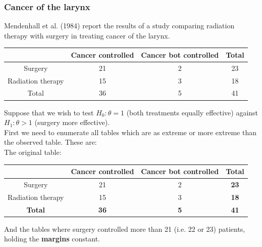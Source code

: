 \documentclass[a4paper]{article}
\begin{document}
\subsubsection{Cancer of the larynx}
Mendenhall et al. (1984) report the results of a study comparing radiation therapy with surgery in treating cancer of the larynx.
\begin{table}[H]
	\centering
	\begin{tabular}{@{}c|cc|c@{}}
	\toprule
				      & \textbf{Cancer controlled} & \textbf{Cancer bot controlled} & \textbf{Total} \\ \midrule
	Surgery           & 21                         & 2                              & 23             \\
	Radiation therapy & 15                         & 3                              & 18             \\ \midrule
	Total             & 36                         & 5                              & 41             \\ \bottomrule
	\end{tabular}
\end{table}
Suppose that we wish to test \( H_0: \theta =1 \) (both treatments equally effective) against \( H_1: \theta >1 \) (surgery more effective).\\
First we need to enumerate all tables which are \textcolor{mygreen}{as extreme} or \textcolor{myred}{more extreme} than the observed table. These are:\\
The original table:
\begin{table}[H]
	\centering
	\begin{tabular}{@{}c|cc|c@{}}
	\toprule
				      & \textbf{Cancer controlled} & \textbf{Cancer bot controlled} & \textbf{Total} \\ \midrule
	Surgery           & \textcolor{mygreen}{21}    & 2                              & \textbf{23}    \\
	Radiation therapy & 15                         & 3                              & \textbf{18}    \\ \midrule
	\textbf{Total}    & \textbf{36}                & \textbf{5}                     & \textbf{41}    \\ \bottomrule
	\end{tabular}
\end{table}
And the tables where surgery controlled more than \textcolor{mygreen}{21} (i.e. \textcolor{myred}{22} or \textcolor{myred}{23}) patients, holding the \textbf{margins} constant.
\end{document}
